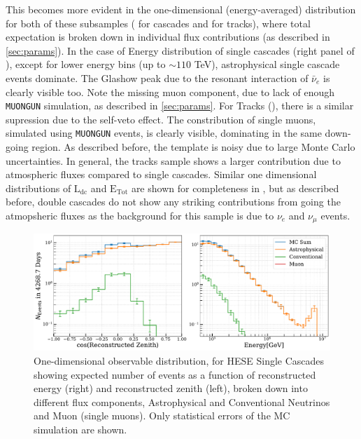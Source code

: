 This becomes more evident in the one-dimensional (energy-averaged) distribution for both of these subsamples ( for cascades and  for tracks), where total expectation is broken down in individual flux contributions (as described in \ref{sec:params}). In the case of Energy distribution of single cascades (right panel of ), except for lower energy bins (up to $\sim110$ TeV), astrophysical single cascade events dominate. The Glashow peak due to the resonant interaction of $\bar{\nu}_e$ is clearly visible too. Note the missing muon component, due to lack of enough \texttt{MUONGUN} simulation, as described in \ref{sec:params}. For Tracks (), there is a similar supression due to the self-veto effect. The constribution of single muons, simulated using \texttt{MUONGUN} events, is clearly visible, dominating in the same down-going region. As described before, the template is noisy due to large Monte Carlo uncertainties. In general, the tracks sample shows a larger contribution due to atmospheric fluxes compared to single cascades. Similar one dimensional distributions of $\mathrm{L}_{\mathrm{dc}}$ and $\mathrm{E}_{\mathrm{Tot}}$ are shown for completeness in , but as described before, double cascades do not show any striking contributions from going the atmopsheric fluxes as the background for this sample is due to $\nu_{e}$ and $\nu_{\mu}$ events.


\begin{figure}[h!]
    \caption[1D observable distribution of the total deposited energy and zenith angle for single cascades]{One-dimensional observable distribution, for HESE Single Cascades showing expected number of events as a function of reconstructed energy (right) and reconstructed zenith (left), broken down into different flux components, Astrophysical and Conventional Neutrinos and Muon (single muons). Only statistical errors of the MC simulation are shown.}
    \includegraphics{./figures/Analysis/Cascades.pdf}
\end{figure}

